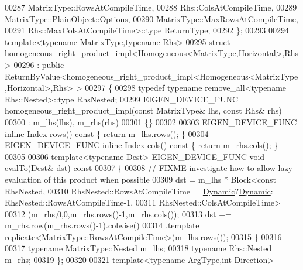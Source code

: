 \begin{DoxyCode}
00287                  MatrixType::RowsAtCompileTime,
00288                  Rhs::ColsAtCompileTime,
00289                  MatrixType::PlainObject::Options,
00290                  MatrixType::MaxRowsAtCompileTime,
00291                  Rhs::MaxColsAtCompileTime>::type ReturnType;
00292 \};
00293 
00294 \textcolor{keyword}{template}<\textcolor{keyword}{typename} MatrixType,\textcolor{keyword}{typename} Rhs>
00295 \textcolor{keyword}{struct }homogeneous\_right\_product\_impl<Homogeneous<MatrixType,\hyperlink{group__enums_ggad49a7b3738e273eb00932271b36127f7aae8a16b3b9272683c1162915f6d892be}{Horizontal}>,Rhs>
00296   : \textcolor{keyword}{public} ReturnByValue<homogeneous\_right\_product\_impl<Homogeneous<MatrixType,Horizontal>,Rhs> >
00297 \{
00298   \textcolor{keyword}{typedef} \textcolor{keyword}{typename} remove\_all<typename Rhs::Nested>::type RhsNested;
00299   EIGEN\_DEVICE\_FUNC homogeneous\_right\_product\_impl(\textcolor{keyword}{const} MatrixType& lhs, \textcolor{keyword}{const} Rhs& rhs)
00300     : m\_lhs(lhs), m\_rhs(rhs)
00301   \{\}
00302 
00303   EIGEN\_DEVICE\_FUNC \textcolor{keyword}{inline} \hyperlink{namespace_eigen_a62e77e0933482dafde8fe197d9a2cfde}{Index} rows()\textcolor{keyword}{ const }\{ \textcolor{keywordflow}{return} m\_lhs.rows(); \}
00304   EIGEN\_DEVICE\_FUNC \textcolor{keyword}{inline} \hyperlink{namespace_eigen_a62e77e0933482dafde8fe197d9a2cfde}{Index} cols()\textcolor{keyword}{ const }\{ \textcolor{keywordflow}{return} m\_rhs.cols(); \}
00305 
00306   \textcolor{keyword}{template}<\textcolor{keyword}{typename} Dest> EIGEN\_DEVICE\_FUNC \textcolor{keywordtype}{void} evalTo(Dest& dst)\textcolor{keyword}{ const}
00307 \textcolor{keyword}{  }\{
00308     \textcolor{comment}{// FIXME investigate how to allow lazy evaluation of this product when possible}
00309     dst = m\_lhs * Block<\textcolor{keyword}{const} RhsNested,
00310                         RhsNested::RowsAtCompileTime==\hyperlink{namespace_eigen_ad81fa7195215a0ce30017dfac309f0b2}{Dynamic}?\hyperlink{namespace_eigen_ad81fa7195215a0ce30017dfac309f0b2}{Dynamic}:
      RhsNested::RowsAtCompileTime-1,
00311                         RhsNested::ColsAtCompileTime>
00312             (m\_rhs,0,0,m\_rhs.rows()-1,m\_rhs.cols());
00313     dst += m\_rhs.row(m\_rhs.rows()-1).colwise()
00314             .template replicate<MatrixType::RowsAtCompileTime>(m\_lhs.rows());
00315   \}
00316 
00317   \textcolor{keyword}{typename} MatrixType::Nested m\_lhs;
00318   \textcolor{keyword}{typename} Rhs::Nested m\_rhs;
00319 \};
00320 
00321 \textcolor{keyword}{template}<\textcolor{keyword}{typename} ArgType,\textcolor{keywordtype}{int} Direction>

\end{DoxyCode}
